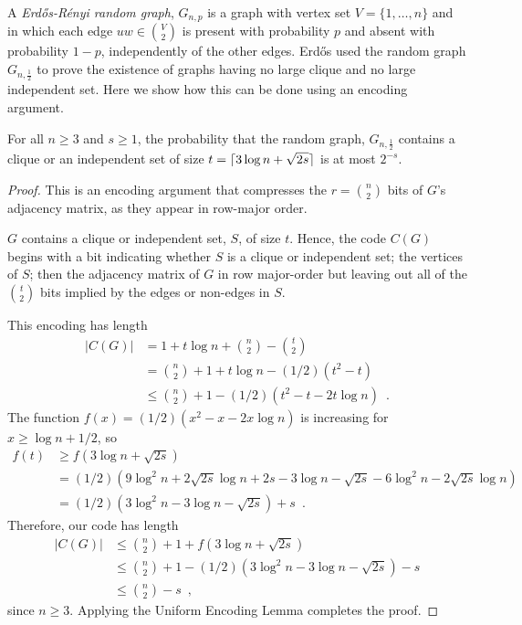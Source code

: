 \documentclass{patmorin}
\begin{document}
A \emph{Erd\H{o}s-R\'enyi random graph}, $G_{n,p}$ is a graph with
vertex set $V=\{1,\ldots,n\}$ and in which each edge
$uw\in \binom{V}{2}$ is present with probability $p$ and absent with
probability $1-p$, independently of the other edges.  Erd\H{o}s
\cite{erdos:some} used the random graph $G_{n,\frac{1}{2}}$ to prove
the existence of graphs having no large clique and no large
independent set. Here we show how this can be done using an encoding
argument.

\begin{thm}
  For all $n\ge 3$ and $s\ge 1$, the probability that the random
  graph, $G_{n,\frac{1}{2}}$ contains a clique or an independent set
  of size $t = {\lceil 3\log n + \sqrt{2s} \rceil}$ is at most $2^{-s}$.
\end{thm}

\begin{proof}
  This is an encoding argument that compresses the $r=\binom{n}{2}$
  bits of $G$'s adjacency matrix, as they appear in row-major order.
  
  $G$ contains a clique or independent set, $S$, of size $t$. Hence,
  the code $C(G)$ begins with a bit indicating whether $S$ is a clique
  or independent set; the vertices of $S$; then the adjacency matrix
  of $G$ in row major-order but leaving out all of the $\binom{t}{2}$
  bits implied by the edges or non-edges in $S$.
  
  This encoding has length
  \begin{align*}
    |C(G)| & = 1 + t\log n + \binom{n}{2}-\binom{t}{2} \\
           & = \binom{n}{2} + 1 + t\log n - (1/2)(t^2 - t) \\
           & \le \binom{n}{2} + 1 - (1/2)(t^2 - t - 2t \log n) \enspace .
  \end{align*}
  The function $f(x) = (1/2)(x^2 - x - 2x \log n)$ is increasing for
  $x \geq \log n + 1/2$, so
  \begin{align*}
    f(t) &\ge f(3\log n + \sqrt{2s}) \\
    &= (1/2)(9 \log^2 n + 2 \sqrt{2s} \log n + 2s - 3 \log n - \sqrt{2s} - 6 \log^2 n - 2 \sqrt{2s} \log n) \\
    &= (1/2)(3 \log^2 n - 3 \log n - \sqrt{2s}) + s \enspace .
  \end{align*}
  Therefore, our code has length
  \begin{align*}
    |C(G)| & \le \binom{n}{2} + 1 + f(3 \log n + \sqrt{2s}) \\
	   & \le \binom{n}{2} + 1 - (1/2)(3 \log^2 n - 3 \log n - \sqrt{2s}) - s \\
           & \le \binom{n}{2} - s \enspace ,
  \end{align*}
  since $n \ge 3$. Applying the Uniform Encoding Lemma completes the
  proof.
\end{proof}
\end{document}
